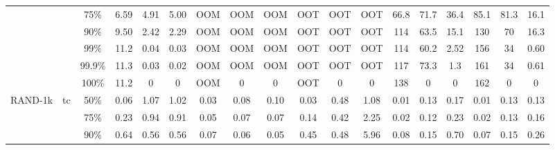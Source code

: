 \documentclass[sigconf,screen,review,natbib]{acmart}
\theoremstyle{definition}
\begin{document}
\begin{table*}
\begin{center}
\begin{tabular}{|c|c|c|c|c|c|c|c|c|c|c|c|c|c|c|c|c|c|}
			        &                         & 75\%   & 6.59                      & 4.91                                   & 5.00                       & OOM                                     & OOM                      & OOM  & OOT  & OOT  & OOT  & 66.8 & 71.7 & 36.4 & 85.1 & 81.3 & 16.1 \\
			        &                         & 90\%   & 9.50                      & 2.42                                   & 2.29                       & OOM                                     & OOM                      & OOM  & OOT  & OOT  & OOT  & 114  & 63.5 & 15.1 & 130  & 70   & 16.3 \\
			        &                         & 99\%   & 11.2                      & 0.04                                   & 0.03                       & OOM                                     & OOM                      & OOM  & OOT  & OOT  & OOT  & 114  & 60.2 & 2.52 & 156  & 34   & 0.60 \\
			        &                         & 99.9\% & 11.3                      & 0.03                                   & 0.02                       & OOM                                     & OOM                      & OOM  & OOT  & OOT  & OOT  & 117  & 73.3 & 1.3  & 161  & 34   & 0.61 \\
			        &                         & 100\%  & 11.2                      & 0                                      & 0                          & OOM                                     & 0                        & 0    & OOT  & 0    & 0    & 138  & 0    & 0    & 162  & 0    & 0    \\
			\hline
			RAND-1k & \multirow{6}{*}{tc}     & 50\%   & 0.06                      & 1.07                                   & 1.02                       & 0.03                                    & 0.08                     & 0.10 & 0.03 & 0.48 & 1.08 & 0.01 & 0.13 & 0.17 & 0.01 & 0.13 & 0.13 \\
			        &                         & 75\%   & 0.23                      & 0.94                                   & 0.91                       & 0.05                                    & 0.07                     & 0.07 & 0.14 & 0.42 & 2.25 & 0.02 & 0.12 & 0.23 & 0.02 & 0.13 & 0.16 \\
			        &                         & 90\%   & 0.64                      & 0.56                                   & 0.56                       & 0.07                                    & 0.06                     & 0.05 & 0.45 & 0.48 & 5.96 & 0.08 & 0.15 & 0.70 & 0.07 & 0.15 & 0.26 \\

\end{tabular}
\end{center}
\end{table*}
\end{document}
